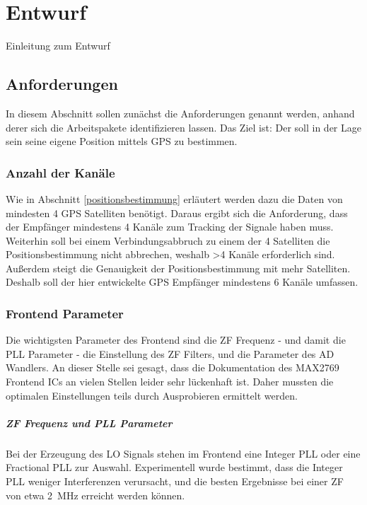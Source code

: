 \chapter{Entwurf}
Einleitung zum Entwurf

\section{Anforderungen}
In diesem Abschnitt sollen zunächst die Anforderungen genannt werden, anhand derer sich die Arbeitspakete identifizieren lassen. Das Ziel ist: Der \dscubesat soll in der Lage sein seine eigene Position mittels GPS zu bestimmen.  

\subsection{Anzahl der Kanäle} Wie in Abschnitt \ref{positionsbestimmung} erläutert werden dazu die Daten von mindesten 4 GPS Satelliten benötigt. Daraus ergibt sich die Anforderung, dass der Empfänger mindestens 4 Kanäle zum Tracking der Signale haben muss. Weiterhin soll bei einem Verbindungsabbruch zu einem der 4 Satelliten die Positionsbestimmung nicht abbrechen, weshalb >4 Kanäle erforderlich sind. Außerdem steigt die Genauigkeit der Positionsbestimmung mit mehr Satelliten. Deshalb soll der hier entwickelte GPS Empfänger mindestens 6 Kanäle umfassen.

\subsection{Frontend Parameter}
Die wichtigsten Parameter des Frontend sind die ZF Frequenz - und damit die PLL Parameter - die Einstellung des ZF Filters, und die Parameter des AD Wandlers. An dieser Stelle sei gesagt, dass die Dokumentation des MAX2769 Frontend ICs an vielen Stellen leider sehr lückenhaft ist. Daher mussten die optimalen Einstellungen teils durch Ausprobieren ermittelt werden.


\paragraph{ZF Frequenz und PLL Parameter}
Bei der Erzeugung des LO Signals stehen im Frontend eine Integer PLL oder eine Fractional PLL zur Auswahl. Experimentell wurde bestimmt, dass die Integer PLL weniger Interferenzen verursacht, und die besten Ergebnisse bei einer ZF von etwa \SI{2}{\MHz} erreicht werden können. 

